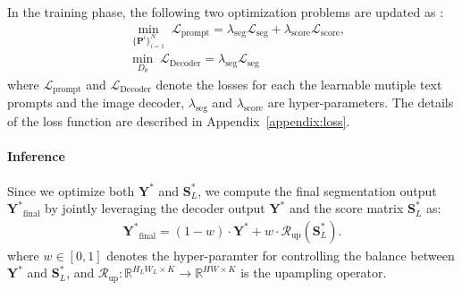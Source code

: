 \documentclass[nohyperref]{article}
\newcommand{\add}[1] {\textcolor{blue}{#1}} %
\newcommand{\bs}{\boldsymbol}
\newcommand{\asty}{{\mathbf{Y}^*}}
\newcommand{\gty}{\mbf{Y}^{\text{gt}}}
\newcommand{\mbf}{\mathbf}
\theoremstyle{plain}
\theoremstyle{definition}
\theoremstyle{remark}
\begin{document}
In the training phase, the following two optimization problems are updated as :
\begin{align}
&\underset{\{\bs{P}^i\}_{i=1}^N} \min \;\mathcal{L}_{\text{prompt}} = \lambda_{\text{seg}} \mathcal{L}_{\text{seg}} + \lambda_{\text{score}} \mathcal{L}_{\text{score}}, \\ &\underset{D_{\theta}} \min \; \mathcal{L}_{\text{Decoder}} = \lambda_{\text{seg}} \mathcal{L}_{\text{seg}}
\label{seg,score_loss}
\end{align}
where $\mathcal{L}_{\text{prompt}}$ and $\mathcal{L}_{\text{Decoder}}$ denote the losses for each the learnable mutiple text prompts and the image decoder, $\lambda_{\text{seg}}$ and $\lambda_{\text{score}}$ are hyper-parameters.
The details of the loss function are described in Appendix~\ref{appendix:loss}. 

\paragraph{Inference}
{Since we optimize both $\asty$ and $\bs{S}^{\ast}_L$, we compute the final segmentation output $\asty_{\text{final}}$ by jointly leveraging the decoder output $\asty$ and the score matrix $\bs{S}^{\ast}_L$ as: 
\begin{eqnarray}
	\asty_{\text{final}} = (1-w) \cdot \asty + w \cdot \mathcal{R}_{\text{up}}(\bs{S}^{\ast}_L).
	\label{eq:final_predict}
\end{eqnarray}
where $w \in [0,1] $ denotes the hyper-paramter for controlling the balance between $\asty$ and $\bs{S}^{\ast}_L$, and $\mathcal{R}_{\text{up}}:\mathbb{R}^{H_LW_L\times K} \rightarrow \mathbb{R}^{H  W\times K} $ is the upampling operator.
}



\end{document}
